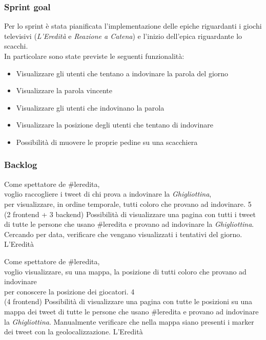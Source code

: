 \subsubsection{Sprint goal}
Per lo sprint è stata pianificata l'implementazione delle epiche riguardanti i giochi televisivi (\textit{L'Eredità} e \textit{Reazione a Catena}) e
l'inizio dell'epica riguardante lo scacchi.\\
In particolare sono state previste le seguenti funzionalità:
\begin{itemize}
    \item Visualizzare gli utenti che tentano a indovinare la parola del giorno
    \item Visualizzare la parola vincente
    \item Visualizzare gli utenti che indovinano la parola
    \item Visualizzare la posizione degli utenti che tentano di indovinare
    \item Possibilità di muovere le proprie pedine su una scacchiera
\end{itemize}


\subsubsection{Backlog}
\userstory%
{Come spettatore de \#leredita,\\voglio raccogliere i tweet di chi prova a indovinare la \textit{Ghigliottina},\\per visualizzare, in ordine temporale, tutti coloro che provano ad indovinare.}%
{5\\(2 frontend + 3 backend)}%
{Possibilità di visualizzare una pagina con tutti i tweet di tutte le persone che usano \#leredita e provano ad indovinare la \textit{Ghigliottina}.}%
{Cercando per data, verificare che vengano visualizzati i tentativi del giorno.}
{L'Eredità}

\userstory%
{Come spettatore de \#leredita,\\voglio visualizzare, su una mappa, la posizione di tutti coloro che provano ad indovinare\\per conoscere la posizione dei giocatori.}%
{4\\(4 frontend)}%
{Possibilità di visualizzare una pagina con tutte le posizioni su una mappa dei tweet di tutte le persone che usano \#leredita e provano ad indovinare la \textit{Ghigliottina}.}%
{Manualmente verificare che nella mappa siano presenti i marker dei tweet con la geolocalizzazione.}
{L'Eredità}

